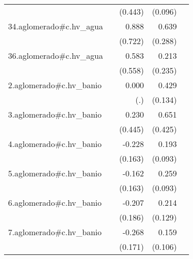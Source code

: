 {\begin{longtable}{l*{4}{D{.}{.}{-1}}}
            &                     &     (0.443)         &     (0.096)         &                     \\
\addlinespace
34.aglomerado#c.hv\_agua&                     &       0.888         &       0.639\sym{*}  &                     \\
            &                     &     (0.722)         &     (0.288)         &                     \\
\addlinespace
36.aglomerado#c.hv\_agua&                     &       0.583         &       0.213         &                     \\
            &                     &     (0.558)         &     (0.235)         &                     \\
\addlinespace
2.aglomerado#c.hv\_banio&                     &       0.000         &       0.429\sym{**} &                     \\
            &                     &         (.)         &     (0.134)         &                     \\
\addlinespace
3.aglomerado#c.hv\_banio&                     &       0.230         &       0.651         &                     \\
            &                     &     (0.445)         &     (0.425)         &                     \\
\addlinespace
4.aglomerado#c.hv\_banio&                     &      -0.228         &       0.193\sym{*}  &                     \\
            &                     &     (0.163)         &     (0.093)         &                     \\
\addlinespace
5.aglomerado#c.hv\_banio&                     &      -0.162         &       0.259\sym{**} &                     \\
            &                     &     (0.163)         &     (0.093)         &                     \\
\addlinespace
6.aglomerado#c.hv\_banio&                     &      -0.207         &       0.214         &                     \\
            &                     &     (0.186)         &     (0.129)         &                     \\
\addlinespace
7.aglomerado#c.hv\_banio&                     &      -0.268         &       0.159         &                     \\
            &                     &     (0.171)         &     (0.106)         &                     \\

\end{longtable}}
